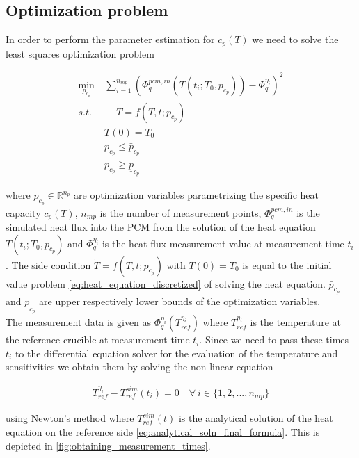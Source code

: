 \documentclass{scrartcl}[12pt, halfparskip]
\numberwithin{equation}{section}
\numberwithin{figure}{section}
\numberwithin{table}{section}
\begin{document}
\subsection{Optimization problem}
\label{sec:optimization_problem}
In order to perform the parameter estimation for $c_p(T)$ we need to solve the least squares optimization problem

\begin{align}
	\min_{p_{c_p}} \ & \sum_{i=1}^{n_{mp}} \left(  \varPhi_{q}^{pcm,in}(T(t_i;T_0,p_{c_p})) - \varPhi_q^{\eta_i} \right)^2 \\
	s.t. \ & \quad \  \dot{T} = f(T,t;p_{c_p}) \nonumber \\
	& T(0) = T_0 \nonumber \\
	& p_{c_p} \le \bar{p}_{c_p} \nonumber \\
	& p_{c_p} \ge \underline{p}_{c_p} \nonumber
	\label{eq:parameter_estimation_least_squares_problem}
\end{align}

where $p_{c_p} \in \mathbb{R}^{n_p}$ are optimization variables parametrizing the specific heat capacity $c_p(T)$, $n_{{mp}}$ is the number of measurement points, $\varPhi_{q}^{pcm,in}$ is the simulated heat flux into the PCM from the solution of the heat equation $T(t_i;T_0,p_{c_p})$ and $\varPhi_q^{\eta_i}$ is the heat flux measurement value at measurement time $t_i$. The side condition $\dot{T} = f(T,t;p_{c_p})$ with $T(0) = T_0$ is equal to the initial value problem \cref{eq:heat_equation_discretized} of solving the heat equation. $\bar{p}_{c_p}$ and $\underline{p}_{c_p}$ are upper respectively lower bounds of the optimization variables. \\

The measurement data is given as $\varPhi_q^{\eta_i}(T_{ref}^{\eta_i})$ where $T_{ref}^{\eta_i}$ is the temperature at the reference crucible at measurement time $t_i$. Since we need to pass these times $t_i$ to the differential equation solver for the evaluation of the temperature and sensitivities we obtain them by solving the non-linear equation 

\begin{align}
	T_{ref}^{\eta_i} - T_{ref}^{sim}(t_i) = 0 \quad \forall \ i \in \{1,2,...,n_{mp}\}
\end{align}

using Newton's method where $T_{ref}^{sim}(t)$ is the analytical solution of the heat equation on the reference side \cref{eq:analytical_soln_final_formula}. This is depicted in \cref{fig:obtaining_measurement_times}.
\end{document}

